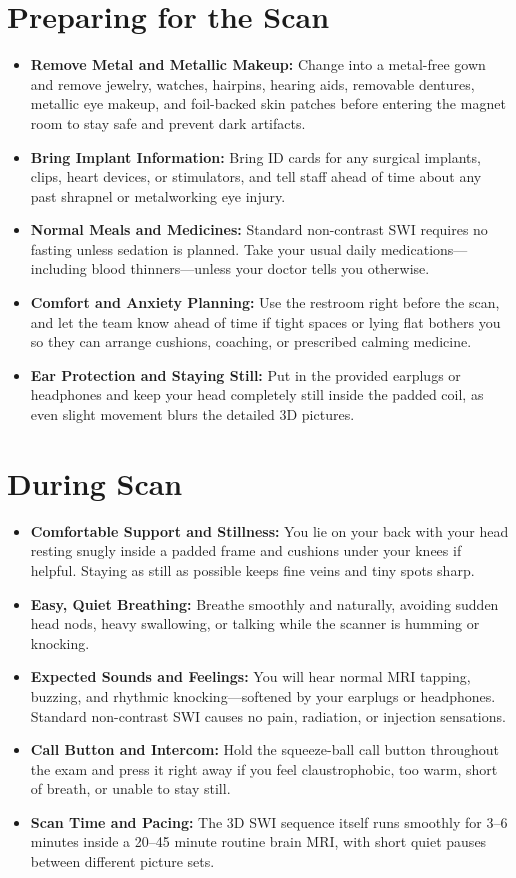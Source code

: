 \section{Preparing for the Scan}

\begin{itemize}
    \item \textbf{Remove Metal and Metallic Makeup:} Change into a metal-free gown and remove jewelry, watches, hairpins, hearing aids, removable dentures, metallic eye makeup, and foil-backed skin patches before entering the magnet room to stay safe and prevent dark artifacts.
    \item \textbf{Bring Implant Information:} Bring ID cards for any surgical implants, clips, heart devices, or stimulators, and tell staff ahead of time about any past shrapnel or metalworking eye injury.
    \item \textbf{Normal Meals and Medicines:} Standard non-contrast SWI requires no fasting unless sedation is planned. Take your usual daily medications---including blood thinners---unless your doctor tells you otherwise.
    \item \textbf{Comfort and Anxiety Planning:} Use the restroom right before the scan, and let the team know ahead of time if tight spaces or lying flat bothers you so they can arrange cushions, coaching, or prescribed calming medicine.
    \item \textbf{Ear Protection and Staying Still:} Put in the provided earplugs or headphones and keep your head completely still inside the padded coil, as even slight movement blurs the detailed 3D pictures.
\end{itemize}

\section{During Scan}

\begin{itemize}
    \item \textbf{Comfortable Support and Stillness:} You lie on your back with your head resting snugly inside a padded frame and cushions under your knees if helpful. Staying as still as possible keeps fine veins and tiny spots sharp.
    \item \textbf{Easy, Quiet Breathing:} Breathe smoothly and naturally, avoiding sudden head nods, heavy swallowing, or talking while the scanner is humming or knocking.
    \item \textbf{Expected Sounds and Feelings:} You will hear normal MRI tapping, buzzing, and rhythmic knocking---softened by your earplugs or headphones. Standard non-contrast SWI causes no pain, radiation, or injection sensations.
    \item \textbf{Call Button and Intercom:} Hold the squeeze-ball call button throughout the exam and press it right away if you feel claustrophobic, too warm, short of breath, or unable to stay still.
    \item \textbf{Scan Time and Pacing:} The 3D SWI sequence itself runs smoothly for 3--6 minutes inside a 20--45 minute routine brain MRI, with short quiet pauses between different picture sets.
\end{itemize}

